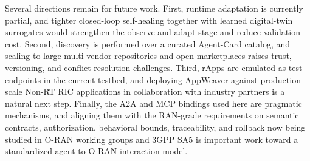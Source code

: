 \documentclass[conference]{IEEEtran}
\begin{document}
Several directions remain for future work. First, runtime adaptation is currently partial, and tighter closed-loop self-healing together with learned digital-twin surrogates would strengthen the observe-and-adapt stage and reduce validation cost. Second, discovery is performed over a curated Agent-Card catalog, and scaling to large multi-vendor repositories and open marketplaces raises trust, versioning, and conflict-resolution challenges. Third, rApps are emulated as test endpoints in the current testbed, and deploying AppWeaver against production-scale Non-RT RIC applications in collaboration with industry partners is a natural next step. Finally, the A2A and MCP bindings used here are pragmatic mechanisms, and aligning them with the RAN-grade requirements on semantic contracts, authorization, behavioral bounds, traceability, and rollback now being studied in O-RAN working groups and 3GPP SA5 is important work toward a standardized agent-to-O-RAN interaction model.



\end{document}
